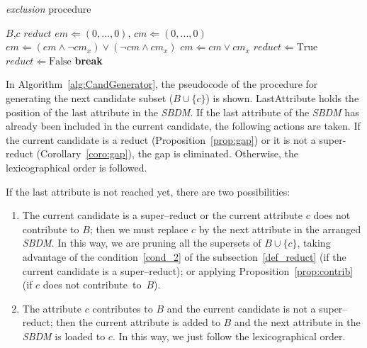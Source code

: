 \documentclass[letterpaper, twoside, openright, 12pt]{book}%
\begin{document}
	\begin{algorithm}
	\footnotesize
	\caption{\textit{exclusion} procedure}
	\label{alg:exclusion}
	\begin{algorithmic}[1]
		\Require $B$,$c$
		\Ensure $reduct$
		\State $em \Leftarrow (0,...,0)$, $cm \Leftarrow (0,...,0)$
		 \label{line:em} 
			\State $em \Leftarrow (em\wedge \neg 
					cm_x) \vee (\neg cm \wedge cm_x)$
			\State $cm \Leftarrow cm \vee cm_x$\label{line:emEnd}
		\EndFor
		\State $reduct \Leftarrow \mathrm{True}$\label{line:reduct}
		  
				\State $reduct \Leftarrow \mathrm{False}$
				\State \textbf{break}\label{line:reductEnd}
			\EndIf
		\EndFor
	\end{algorithmic}
	\end{algorithm}
	
	In Algorithm~\ref{alg:CandGenerator}, the pseudocode of the procedure for generating the next candidate subset ($B\cup \lbrace c\rbrace$) is shown. LastAttribute holds the position of the last attribute in the \textit{SBDM}. If the last attribute of the \textit{SBDM} has already been included in the current candidate, the following actions are taken. If the current candidate is a reduct (Proposition~\ref{prop:gap}) or it is not a super-reduct (Corollary~\ref{coro:gap}), the gap is eliminated.	Otherwise, the lexicographical order is followed. 
	
	If the last attribute is not reached yet, there are two possibilities:			
	\begin{enumerate}
		\item The current candidate is a super--reduct or the current attribute $c$ does not contribute to $B$; then we must replace $c$ by the next attribute in the arranged \textit{SBDM}. In this way, we are pruning all the supersets of $B\cup\lbrace c\rbrace$, taking advantage of the condition~\ref{cond_2} of the subsection~\ref{def_reduct} (if the current candidate is a super--reduct); or applying Proposition~\ref{prop:contrib} (if $c$ does not contribute~to~$B$).
		
		\item The attribute $c$ contributes to $B$ and the current candidate is not a super--reduct; then the current attribute is added to $B$ and the next attribute in the \textit{SBDM} is loaded to $c$. In this way, we just follow the lexicographical order.
	\end{enumerate}  	
			
\end{document}
